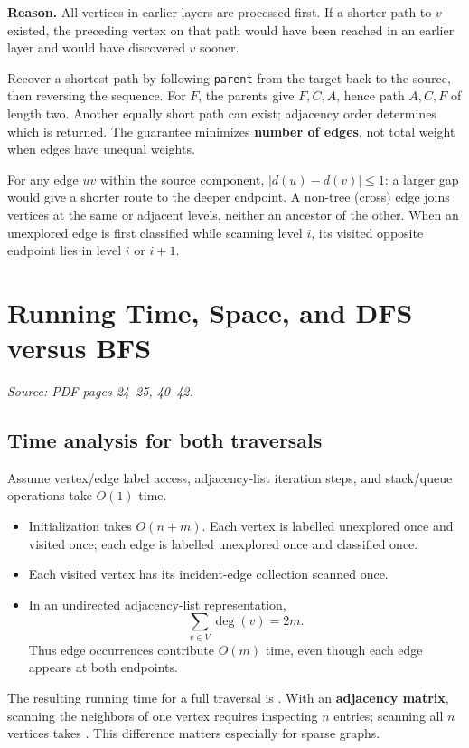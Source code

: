 \documentclass[11pt,letterpaper]{article}
\newcommand{\sourcepages}[1]{\textit{Source: PDF pages #1.}}
\newcommand{\method}[1]{\texttt{#1}}
\begin{document}
\textbf{Reason.} All vertices in earlier layers are processed first. If a shorter path to $v$ existed, the preceding vertex on that path would have been reached in an earlier layer and would have discovered $v$ sooner.

Recover a shortest path by following \method{parent} from the target back to the source, then reversing the sequence. For $F$, the parents give $F,C,A$, hence path $A,C,F$ of length two. Another equally short path can exist; adjacency order determines which is returned. The guarantee minimizes \textbf{number of edges}, not total weight when edges have unequal weights.

For any edge $uv$ within the source component, $|d(u)-d(v)|\leq 1$: a larger gap would give a shorter route to the deeper endpoint. A non-tree (cross) edge joins vertices at the same or adjacent levels, neither an ancestor of the other. When an unexplored edge is first classified while scanning level $i$, its visited opposite endpoint lies in level $i$ or $i+1$.

\clearpage
\section{Running Time, Space, and DFS versus BFS}
\sourcepages{24--25, 40--42}

\subsection{Time analysis for both traversals}
Assume vertex/edge label access, adjacency-list iteration steps, and stack/queue operations take $O(1)$ time.
\begin{itemize}
    \item Initialization takes $O(n+m)$. Each vertex is labelled unexplored once and visited once; each edge is labelled unexplored once and classified once.
    \item Each visited vertex has its incident-edge collection scanned once.
    \item In an undirected adjacency-list representation,
    \[
        \sum_{v\in V}\deg(v)=2m.
    \]
    Thus edge occurrences contribute $O(m)$ time, even though each edge appears at both endpoints.
\end{itemize}
The resulting running time for a full traversal is . With an \textbf{adjacency matrix}, scanning the neighbors of one vertex requires inspecting $n$ entries; scanning all $n$ vertices takes . This difference matters especially for sparse graphs.
\end{document}
